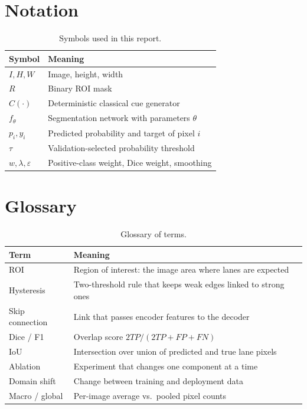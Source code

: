 \documentclass[10pt,a4paper,twocolumn]{article}
\begin{document}
\section{Notation}
\begin{table}[H]
\centering
\caption{Symbols used in this report.}
\footnotesize
\begin{tabular}{|l|l|}
\hline
\rowcolor{gray!18}\textbf{Symbol}&\textbf{Meaning}\\ \hline
$I, H, W$ & Image, height, width\\ \hline
$R$ & Binary ROI mask\\ \hline
$C(\cdot)$ & Deterministic classical cue generator\\ \hline
$f_\theta$ & Segmentation network with parameters $\theta$\\ \hline
$p_i, y_i$ & Predicted probability and target of pixel $i$\\ \hline
$\tau$ & Validation-selected probability threshold\\ \hline
$w, \lambda, \varepsilon$ & Positive-class weight, Dice weight, smoothing\\ \hline
\end{tabular}
\end{table}

\section{Glossary}
\begin{table}[H]
\centering
\caption{Glossary of terms.}
\footnotesize
\begin{tabularx}{\columnwidth}{|l|X|}
\hline
\rowcolor{gray!18}\textbf{Term}&\textbf{Meaning}\\ \hline
ROI & Region of interest: the image area where lanes are expected\\ \hline
Hysteresis & Two-threshold rule that keeps weak edges linked to strong ones\\ \hline
Skip connection & Link that passes encoder features to the decoder\\ \hline
Dice / F1 & Overlap score $2TP/(2TP+FP+FN)$\\ \hline
IoU & Intersection over union of predicted and true lane pixels\\ \hline
Ablation & Experiment that changes one component at a time\\ \hline
Domain shift & Change between training and deployment data\\ \hline
Macro / global & Per-image average vs.\ pooled pixel counts\\ \hline
\end{tabularx}
\end{table}
\end{document}
